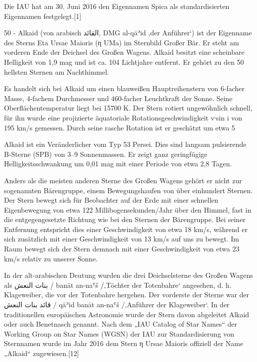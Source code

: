 Die IAU hat am 30. Juni 2016 den Eigennamen Spica als standardisierten Eigennamen festgelegt.[1] 



50 - Alkaid (von arabisch القائد, DMG al-qāʾid ‚der Anführer‘) ist der Eigenname des Sterns Eta Ursae Maioris (η UMa) im Sternbild Großer Bär. Er steht am vorderen Ende der Deichsel des Großen Wagens. Alkaid besitzt eine scheinbare Helligkeit von 1,9 mag und ist ca. 104 Lichtjahre entfernt. Er gehört zu den 50 hellsten Sternen am Nachthimmel.

Es handelt sich bei Alkaid um einen blauweißen Hauptreihenstern von 6-facher Masse, 4-fachem Durchmesser und 460-facher Leuchtkraft der Sonne. Seine Oberflächentemperatur liegt bei 15700 K. Der Stern rotiert ungewöhnlich schnell, für ihn wurde eine projizierte äquatoriale Rotationsgeschwindigkeit v∙sin i von 195 km/s gemessen. Durch seine rasche Rotation ist er geschätzt um etwa 5 %

Alkaid ist ein Veränderlicher vom Typ 53 Persei. Dies sind langsam pulsierende B-Sterne (SPB) von 3–9 Sonnenmassen. Er zeigt ganz geringfügige Helligkeitsschwankung um 0,01 mag mit einer Periode von etwa 2,8 Tagen.

Anders als die meisten anderen Sterne des Großen Wagens gehört er nicht zur sogenannten Bärengruppe, einem Bewegungshaufen von über einhundert Sternen. Der Stern bewegt sich für Beobachter auf der Erde mit einer schnellen Eigenbewegung von etwa 122 Millibogensekunden/Jahr über den Himmel, fast in die entgegengesetzte Richtung wie bei den Sternen der Bärengruppe. Bei seiner Entfernung entspricht dies einer Geschwindigkeit von etwa 18 km/s, während er sich zusätzlich mit einer Geschwindigkeit von 13 km/s auf uns zu bewegt. Im Raum bewegt sich der Stern demnach mit einer Geschwindigkeit von etwa 23 km/s relativ zu unserer Sonne.

In der alt-arabischen Deutung wurden die drei Deichselsterne des Großen Wagens als بنات النعش / banāt an-naʿš /‚Töchter der Totenbahre‘ angesehen, d. h. Klageweiber, die vor der Totenbahre hergehen. Der vorderste der Sterne war der قائد بنات النعش / qāʾid banāt an-naʿš /‚Anführer der Klageweiber‘. In der traditionellen europäischen Astronomie wurde der Stern davon abgeleitet Alkaid oder auch Benetnasch genannt. Nach dem „IAU Catalog of Star Names“ der Working Group on Star Names (WGSN) der IAU zur Standardisierung von Sternnamen wurde im Jahr 2016 dem Stern η Ursae Maioris offiziell der Name „Alkaid“ zugewiesen.[12] 



